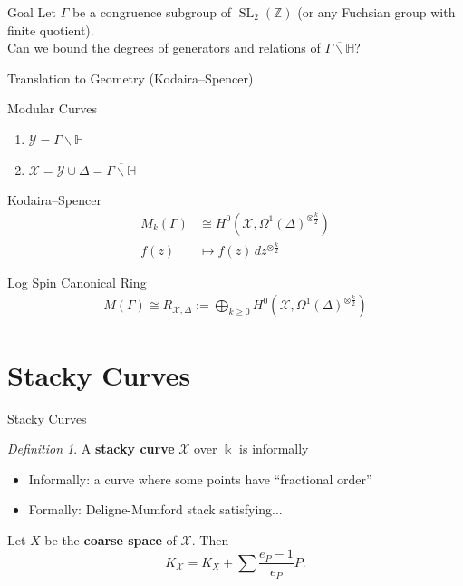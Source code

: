 \documentclass{beamer}
\theoremstyle{remark}
\newtheorem{defn}[thm]{Definition}
\newcommand\BH{{\mathbb H}}
\newcommand\BBZ{{\mathbb Z}}
\newcommand \sx{{\mathscr X}}
\newcommand \sy{{\mathscr Y}}
\newcommand{\SL}{\operatorname{SL}}
\newcommand\Bk{{\Bbbk}}
\begin{document}

\begin{frame}

\begin{block}{Goal}
Let $\Gamma$ be a congruence subgroup of $\SL_2(\BBZ)$ (or any Fuchsian group with finite quotient). \\
Can we bound the degrees of generators and relations of $\overline{\Gamma \backslash \mathbb{H}}$?
\end{block}

\end{frame}


\begin{frame}{Translation to Geometry (Kodaira--Spencer)}
\begin{block}{Modular Curves}
\begin{enumerate}
  \item $\sy = \Gamma \backslash \BH$
  \item $\sx = \sy \cup \Delta = \overline{\Gamma \backslash \BH}$
\end{enumerate}
\end{block}

\begin{block}{Kodaira--Spencer}
\begin{align*}
  M_k(\Gamma) &\cong H^0(\sx, \Omega^1(\Delta)^{\otimes \frac{k}{2}}) \\
	f(z) &\mapsto f(z)\, dz^{\otimes \frac{k}{2}}
\end{align*}
\end{block}

\begin{block}{Log Spin Canonical Ring}
\begin{align*}
  M(\Gamma) \cong R_{\sx,\Delta} := \bigoplus_{k \geq 0} H^0(\sx, \Omega^1(\Delta)^{\otimes \frac{k}{2}})
\end{align*}
\end{block}

\end{frame}

\section{Stacky Curves}

\begin{frame}{Stacky Curves}
\begin{defn}
A \textbf{stacky curve} $\sx$ over $\Bk$
is informally
	\begin{itemize}
		\item Informally: a curve where some points have ``fractional order''
		\item Formally: Deligne-Mumford stack satisfying...
	\end{itemize}
\end{defn}

\begin{fact}
Let $X$ be the {\bf coarse space} of $\sx$. Then
\[
	K_{\sx} = K_X + \sum \frac{e_P-1}{e_P} P.
\]
\end{fact}
\end{frame}
\end{document}
